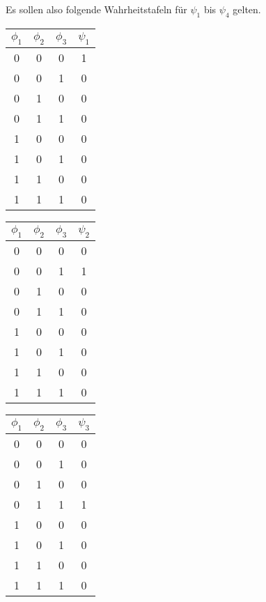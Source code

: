 \documentclass[11pt,a4paper,leqno]{report}
\numberwithin{equation}{chapter}
\begin{document}
Es sollen also folgende Wahrheitstafeln für $\psi_1$ bis $\psi_4$ gelten.
\begin{center}
	\begin{minipage}{1.2in}
		\begin{tabular}{|c c c|c|}
			$\phi_1$ & $\phi_2$ & $\phi_3$ &$\psi_1$\\
			\hline
			0 & 0 & 0 & 1\\
			0 & 0 & 1 & 0\\
			0 & 1 & 0 & 0\\
			0 & 1 & 1 & 0\\
			1 & 0 & 0 & 0\\
			1 & 0 & 1 & 0\\
			1 & 1 & 0 & 0\\
			1 & 1 & 1 & 0\\
			\hline
		\end{tabular}  
	\end{minipage}
	\begin{minipage}{1.2in}
		\begin{tabular}{|c c c|c|}
			$\phi_1$ & $\phi_2$ & $\phi_3$ &$\psi_2$\\
			\hline
			0 & 0 & 0 & 0\\
			0 & 0 & 1 & 1\\
			0 & 1 & 0 & 0\\
			0 & 1 & 1 & 0\\
			1 & 0 & 0 & 0\\
			1 & 0 & 1 & 0\\
			1 & 1 & 0 & 0\\
			1 & 1 & 1 & 0\\
			\hline
	\end{tabular}
	\end{minipage}  
	\begin{minipage}{1.2in}
		\begin{tabular}{|c c c|c|}
			$\phi_1$ & $\phi_2$ & $\phi_3$ &$\psi_3$\\
			\hline
			0 & 0 & 0 & 0\\
			0 & 0 & 1 & 0\\
			0 & 1 & 0 & 0\\
			0 & 1 & 1 & 1\\
			1 & 0 & 0 & 0\\
			1 & 0 & 1 & 0\\
			1 & 1 & 0 & 0\\
			1 & 1 & 1 & 0\\
			\hline
		\end{tabular}  
	\end{minipage}

\end{center}
\end{document}
